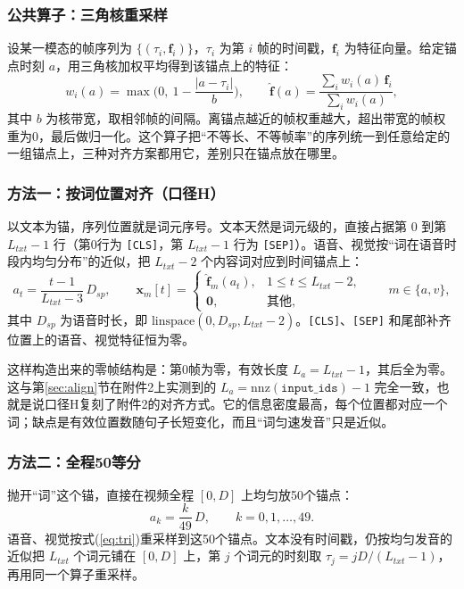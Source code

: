 \subsubsection{公共算子：三角核重采样}

设某一模态的帧序列为 $\{(\tau_i,\mathbf{f}_i)\}$，$\tau_i$ 为第 $i$ 帧的时间戳，$\mathbf{f}_i$ 为特征向量。给定锚点时刻 $a$，用三角核加权平均得到该锚点上的特征：
\begin{equation}\label{eq:tri}
w_i(a)=\max\!\Big(0,\ 1-\frac{|a-\tau_i|}{b}\Big),\qquad
\hat{\mathbf{f}}(a)=\frac{\sum_i w_i(a)\,\mathbf{f}_i}{\sum_i w_i(a)},
\end{equation}
其中 $b$ 为核带宽，取相邻帧的间隔。离锚点越近的帧权重越大，超出带宽的帧权重为0，最后做归一化。这个算子把“不等长、不等帧率”的序列统一到任意给定的一组锚点上，三种对齐方案都用它，差别只在锚点放在哪里。

\subsubsection{方法一：按词位置对齐（口径H）}

以文本为锚，序列位置就是词元序号。文本天然是词元级的，直接占据第 $0$ 到第 $L_{txt}-1$ 行（第0行为 \texttt{[CLS]}，第 $L_{txt}-1$ 行为 \texttt{[SEP]}）。语音、视觉按“词在语音时段内均匀分布”的近似，把 $L_{txt}-2$ 个内容词对应到时间锚点上：
\begin{equation}\label{eq:anchorH}
a_t=\frac{t-1}{L_{txt}-3}\,D_{sp},\qquad
\mathbf{x}_m[t]=\begin{cases}\hat{\mathbf{f}}_m(a_t), & 1\le t\le L_{txt}-2,\\ \mathbf{0}, & \text{其他},\end{cases}\qquad m\in\{a,v\},
\end{equation}
其中 $D_{sp}$ 为语音时长，即 $\mathrm{linspace}(0,D_{sp},L_{txt}-2)$。\texttt{[CLS]}、\texttt{[SEP]} 和尾部补齐位置上的语音、视觉特征恒为零。

这样构造出来的零帧结构是：第0帧为零，有效长度 $L_a=L_{txt}-1$，其后全为零。这与第\ref{sec:align}节在附件2上实测到的 $L_a=\mathrm{nnz}(\texttt{input\_ids})-1$ 完全一致，也就是说口径H复刻了附件2的对齐方式。它的信息密度最高，每个位置都对应一个词；缺点是有效位置数随句子长短变化，而且“词匀速发音”只是近似。

\subsubsection{方法二：全程50等分}

抛开“词”这个锚，直接在视频全程 $[0,D]$ 上均匀放50个锚点：
\begin{equation}\label{eq:anchorT}
a_k=\frac{k}{49}\,D,\qquad k=0,1,\dots,49.
\end{equation}
语音、视觉按式(\ref{eq:tri})重采样到这50个锚点。文本没有时间戳，仍按均匀发音的近似把 $L_{txt}$ 个词元铺在 $[0,D]$ 上，第 $j$ 个词元的时刻取 $\tau_j=jD/(L_{txt}-1)$，再用同一个算子重采样。

